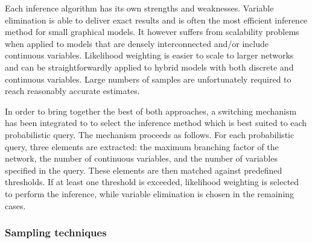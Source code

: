 Each inference algorithm has its own strengths and weaknesses. Variable elimination is able to deliver exact results and is often the most efficient inference method for small graphical models.  It however suffers from scalability problems when applied to models that are densely interconnected and/or include continuous variables. Likelihood weighting is easier to scale to larger networks and can be straightforwardly applied to hybrid models with both discrete and continuous variables. Large numbers of samples are unfortunately required to reach reasonably accurate estimates.

In order to bring together the best of both approaches, a switching mechanism has been integrated to \opendial to select the inference method which is best suited to each probabilistic query.  The mechanism proceeds as follows. For each probabilistic query, three elements are extracted: the maximum branching factor of the network, the number of continuous variables, and the number of variables specified in the query. These elements are then matched against predefined thresholds. If at least one threshold is exceeded, likelihood weighting is selected to perform the inference, while variable elimination is chosen in the remaining cases. 

\subsubsection*{Sampling techniques}

